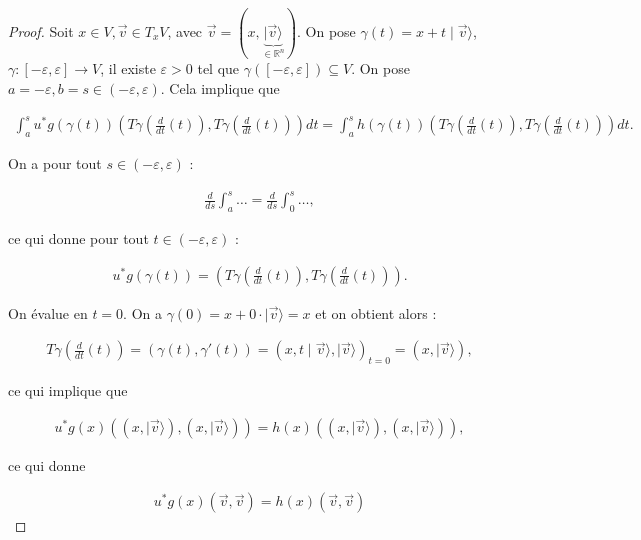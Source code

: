 \documentclass[french]{article}
\theoremstyle{definition}
\theoremstyle{remark}
\newcommand{\biggg}{>}
\newcommand{\bg}{\biggg}
\begin{document}
\begin{proof}
  Soit \(x \in V, \overrightarrow{v} \in T_x V\), avec \(\overrightarrow{v}=(x, \underbrace{\mid \overrightarrow{v} \rangle}_{\in \mathbb{R}^n})\). On pose \(\gamma(t) = x + t \mid \overrightarrow{v} \rangle\), \(\gamma : [-\varepsilon, \varepsilon] \longrightarrow V\), il existe \(\varepsilon \bg 0\) tel que \(\gamma([-\varepsilon, \varepsilon]) \subseteq V\).
  On pose \(a = -\varepsilon,b=s \in (-\varepsilon,\varepsilon)\). Cela implique que

  \begin{gather*}
    \int_{a}^{s} u ^{*}g(\gamma(t)) \left(T \gamma \left(\frac{d}{dt}(t)\right), T \gamma \left(\frac{d}{dt}(t)\right)\right) dt = \int_{a}^{s} h(\gamma(t)) \left(T \gamma \left(\frac{d}{dt}(t)\right), T \gamma \left(\frac{d}{dt}(t)\right)\right) dt.
  \end{gather*}

  On a pour tout \(s \in (-\varepsilon, \varepsilon)\) :

  \begin{gather*}
    \frac{d}{ds} \int_{a}^{s}  \dots = \frac{d}{ds} \int_{0}^{s} \dots,
  \end{gather*}

  ce qui donne pour tout \(t \in (-\varepsilon, \varepsilon)\) :

  \begin{gather*}
    u ^{*}g(\gamma(t)) = \left(T \gamma \left(\frac{d}{dt}(t)\right), T \gamma \left(\frac{d}{dt}(t)\right)\right).
  \end{gather*}

  On évalue en \(t = 0\). On a \(\gamma(0) = x + 0 \cdot \mid \overrightarrow{v} \rangle = x\) et on obtient alors :

  \begin{gather*}
    T \gamma \left(\frac{d}{dt}(t)\right) = (\gamma(t), \gamma'(t)) = (x, t \mid \overrightarrow{v} \rangle, \mid \overrightarrow{v} \rangle)_{t=0} = (x, \mid \overrightarrow{v} \rangle),
  \end{gather*}

  ce qui implique que

  \begin{gather*}
    u ^{*}g(x)((x,\mid \overrightarrow{v} \rangle), (x, \mid \overrightarrow{v} \rangle)) = h(x)((x,\mid \overrightarrow{v} \rangle), (x,\mid \overrightarrow{v} \rangle)),
  \end{gather*}

  ce qui donne

  \begin{gather*}
    u ^{*}g(x)(\overrightarrow{v},\overrightarrow{v}) = h(x)(\overrightarrow{v}, \overrightarrow{v})
  \end{gather*}
\end{proof}
\end{document}
